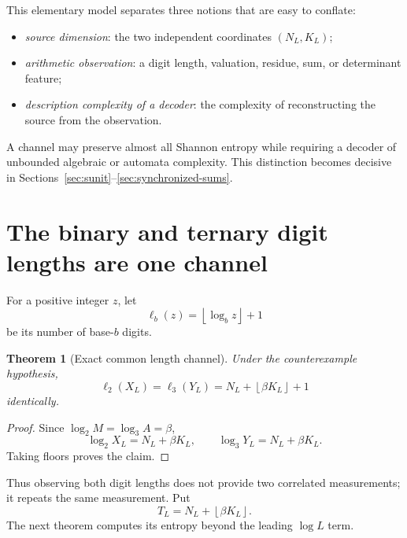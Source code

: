 \documentclass[11pt,oneside]{article}
\newtheorem{theorem}{Theorem}[section]
\theoremstyle{definition}
\theoremstyle{remark}
\newcommand{\floor}[1]{\left\lfloor #1\right\rfloor}
\begin{document}
This elementary model separates three notions that are easy to conflate:
\begin{itemize}
  \item \emph{source dimension}: the two independent coordinates $(N_L,K_L)$;
  \item \emph{arithmetic observation}: a digit length, valuation, residue, sum, or determinant feature;
  \item \emph{description complexity of a decoder}: the complexity of reconstructing the source from the observation.
\end{itemize}
A channel may preserve almost all Shannon entropy while requiring a decoder of unbounded algebraic or automata complexity.  This distinction becomes decisive in Sections~\ref{sec:sunit}--\ref{sec:synchronized-sums}.

\section{The binary and ternary digit lengths are one channel}\label{sec:length}

For a positive integer $z$, let
\[
  \ell_b(z)=\floor{\log_b z}+1
\]
be its number of base-$b$ digits.

\begin{theorem}[Exact common length channel]\label{thm:length-identity}
Under the counterexample hypothesis,
\begin{equation}\label{eq:length-equality}
 \ell_2(X_L)=\ell_3(Y_L)=N_L+\floor{\beta K_L}+1
\end{equation}
identically.
\end{theorem}

\begin{proof}
Since $\log_2M=\log_3A=\beta$,
\[
 \log_2X_L=N_L+\beta K_L,
 \qquad
 \log_3Y_L=N_L+\beta K_L.
\]
Taking floors proves the claim.
\end{proof}

Thus observing both digit lengths does not provide two correlated measurements; it repeats the same measurement.  Put
\begin{equation}\label{eq:T}
  T_L=N_L+\floor{\beta K_L}.
\end{equation}
The next theorem computes its entropy beyond the leading $\log L$ term.
\end{document}

